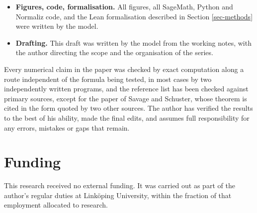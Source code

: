 \documentclass[11pt, a4paper, abstract=yes]{scrartcl}
\theoremstyle{definition}
\theoremstyle{remark}
\theoremstyle{plain}
\theoremstyle{remark}
\theoremstyle{plain}
\begin{document}
\begin{itemize}
\(n-1\) follows an unrepeated value (Example \ref{ex-codegree-product}). Reviewed. The direct proof of
Lemma \ref{lem-interior-points}(2) was written by the model later, when the lemma was moved ahead of
Proposition \ref{prop-hstar-props}, and has been checked by computation only.
\item \textbf{Figures, code, formalisation.} All figures, all SageMath, Python and Normaliz code, and the Lean
formalisation described in Section \ref{sec-methods} were written by the model.
\item \textbf{Drafting.} This draft was written by the model from the working notes, with the author directing
the scope and the organisation of the series.
\end{itemize}

Every numerical claim in the paper was checked by exact computation along a route independent of the
formula being tested, in most cases by two independently written programs, and the reference list has
been checked against primary sources, except for the paper of Savage and Schuster, whose theorem is
cited in the form quoted by two other sources. The author has verified the results to the best of his
ability, made the final edits, and assumes full responsibility for any errors, mistakes or gaps that
remain.
\section*{Funding}
\label{sec:org49bd22b}
This research received no external funding. It was carried out as part of the author's regular duties
at Linköping University, within the fraction of that employment allocated to research.
\end{document}
